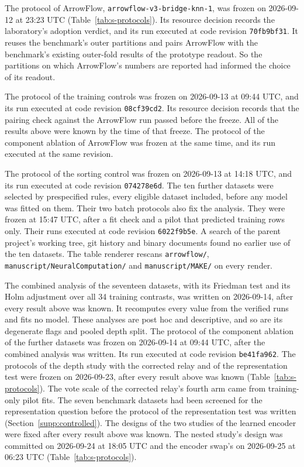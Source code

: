 The protocol of ArrowFlow, \texttt{arrowflow-v3-bridge-knn-1}, was frozen on 2026-09-12 at 23:23 UTC (Table~\ref{tab:s-protocols}). Its resource decision records the laboratory's adoption verdict, and its run executed at code revision \texttt{70fb9bf31}. It reuses the benchmark's outer partitions and pairs ArrowFlow with the benchmark's existing outer-fold results of the prototype readout. So the partitions on which ArrowFlow's numbers are reported had informed the choice of its readout.

The protocol of the training controls was frozen on 2026-09-13 at 09:44 UTC, and its run executed at code revision \texttt{08cf39cd2}. Its resource decision records that the pairing check against the ArrowFlow run passed before the freeze. All of the results above were known by the time of that freeze. The protocol of the component ablation of ArrowFlow was frozen at the same time, and its run executed at the same revision.

The protocol of the sorting control was frozen on 2026-09-13 at 14:18 UTC, and its run executed at code revision \texttt{074278e6d}. The ten further datasets were selected by prespecified rules, every eligible dataset included, before any model was fitted on them. Their two batch protocols also fix the analysis. They were frozen at 15:47 UTC, after a fit check and a pilot that predicted training rows only. Their runs executed at code revision \texttt{6022f9b5e}. A search of the parent project's working tree, git history and binary documents found no earlier use of the ten datasets. The table renderer rescans \texttt{arrowflow/}, \texttt{manuscript/NeuralComputation/} and \texttt{manuscript/MAKE/} on every render.

The combined analysis of the seventeen datasets, with its Friedman test and its Holm adjustment over all 34 training contrasts, was written on 2026-09-14, after every result above was known. It recomputes every value from the verified runs and fits no model. These analyses are post hoc and descriptive, and so are its degenerate flags and pooled depth split. The protocol of the component ablation of the further datasets was frozen on 2026-09-14 at 09:44 UTC, after the combined analysis was written. Its run executed at code revision \texttt{be41fa962}. The protocols of the depth study with the corrected relay and of the representation test were frozen on 2026-09-23, after every result above was known (Table~\ref{tab:s-protocols}). The vote scale of the corrected relay's fourth arm came from training-only pilot fits. The seven benchmark datasets had been screened for the representation question before the protocol of the representation test was written (Section~\ref{supp:controlled}). The designs of the two studies of the learned encoder were fixed after every result above was known. The nested study's design was committed on 2026-09-24 at 18:05 UTC and the encoder swap's on 2026-09-25 at 06:23 UTC (Table~\ref{tab:s-protocols}).


